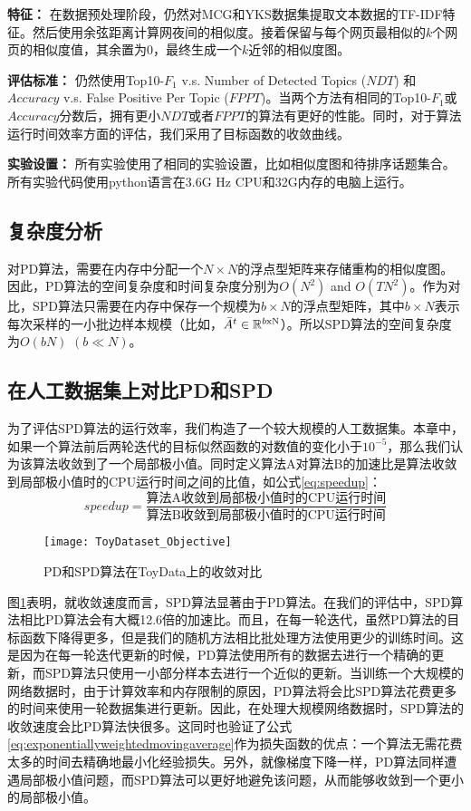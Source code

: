 \textbf{特征：} 在数据预处理阶段，仍然对MCG和YKS数据集提取文本数据的TF-IDF特征。然后使用余弦距离计算网夜间的相似度。接着保留与每个网页最相似的$k$个网页的相似度值，其余置为0，最终生成一个$k$近邻的相似度图。

\textbf{评估标准：} 仍然使用Top10-$F_1$ v.s. Number of Detected Topics ($NDT$)\citep{cao-2011-tracking} 和 $Accuracy$ v.s. False Positive Per Topic ($FPPT$)\citep{pang-2013-unsupervised}。当两个方法有相同的Top10-$F_1$或$Accuracy$分数后，拥有更小$NDT$或者$FPPT$的算法有更好的性能。同时，对于算法运行时间效率方面的评估，我们采用了目标函数的收敛曲线。

\textbf{实验设置：} 所有实验使用了相同的实验设置，比如相似度图和待排序话题集合。所有实验代码使用python语言在3.6G Hz CPU和32G内存的电脑上运行。


\subsection{复杂度分析}

对PD算法，需要在内存中分配一个$N\times N$的浮点型矩阵来存储重构的相似度图。因此，PD算法的空间复杂度和时间复杂度分别为$O(N^2)$ and $O(TN^2)$。作为对比，SPD算法只需要在内存中保存一个规模为$b\times N$的浮点型矩阵，其中$b\times N$表示每次采样的一小批边样本规模（比如，$\bar{A}^t\in \mathbb{R}^{b \rm x N}$）。所以SPD算法的空间复杂度为$O(bN)$ $(b\ll N)$。


\subsection{在人工数据集上对比PD和SPD}

为了评估SPD算法的运行效率，我们构造了一个较大规模的人工数据集。本章中，如果一个算法前后两轮迭代的目标似然函数的对数值的变化小于$10^{-5}$，那么我们认为该算法收敛到了一个局部极小值。同时定义算法A对算法B的加速比是算法收敛到局部极小值时的CPU运行时间之间的比值，如公式\eqref{eq:speedup}：
\begin{equation}\label{eq:speedup}
speedup = \frac{\text{算法A收敛到局部极小值时的CPU运行时间}}{\text{算法B收敛到局部极小值时的CPU运行时间}}
\end{equation}

\begin{figure}[!htbp]
    \centering
    \texttt{[image: ToyDataset\_Objective]}
    \caption{PD和SPD算法在ToyData上的收敛对比}
    \label{fig:ToyDataset_Objective}
\end{figure}
图\ref{fig:ToyDataset_Objective}表明，就收敛速度而言，SPD算法显著由于PD算法。在我们的评估中，SPD算法相比PD算法会有大概12.6倍的加速比。而且，在每一轮迭代，虽然PD算法的目标函数下降得更多，但是我们的随机方法相比批处理方法使用更少的训练时间。这是因为在每一轮迭代更新的时候，PD算法使用所有的数据去进行一个精确的更新，而SPD算法只使用一小部分样本去进行一个近似的更新。当训练一个大规模的网络数据时，由于计算效率和内存限制的原因，PD算法将会比SPD算法花费更多的时间来使用一轮数据集进行更新。因此，在处理大规模网络数据时，SPD算法的收敛速度会比PD算法快很多。这同时也验证了公式\eqref{eq:exponentiallyweightedmovingaverage}作为损失函数的优点：一个算法无需花费太多的时间去精确地最小化经验损失。另外，就像梯度下降一样，PD算法同样遭遇局部极小值问题，而SPD算法可以更好地避免该问题，从而能够收敛到一个更小的局部极小值。


